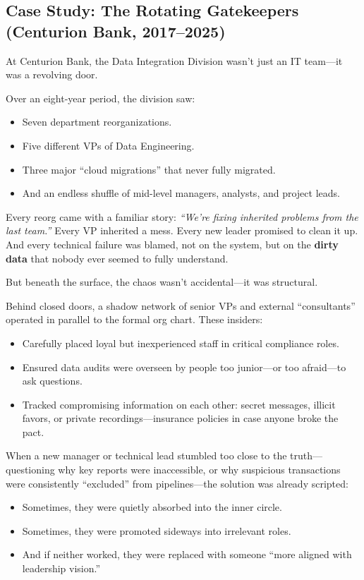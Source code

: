 \subsection{Case Study: The Rotating Gatekeepers (Centurion Bank, 2017–2025)}

At Centurion Bank, the Data Integration Division wasn’t just an IT team—it was a revolving door.

Over an eight-year period, the division saw:
\begin{itemize}
  \item Seven department reorganizations.
  \item Five different VPs of Data Engineering.
  \item Three major “cloud migrations” that never fully migrated.
  \item And an endless shuffle of mid-level managers, analysts, and project leads.
\end{itemize}

Every reorg came with a familiar story:  
\textit{“We’re fixing inherited problems from the last team.”}  
Every VP inherited a mess. Every new leader promised to clean it up.  
And every technical failure was blamed, not on the system, but on the \textbf{dirty data} that nobody ever seemed to fully understand.

\medskip

But beneath the surface, the chaos wasn’t accidental—it was structural.

Behind closed doors, a shadow network of senior VPs and external “consultants” operated in parallel to the formal org chart. These insiders:
\begin{itemize}
  \item Carefully placed loyal but inexperienced staff in critical compliance roles.
  \item Ensured data audits were overseen by people too junior—or too afraid—to ask questions.
  \item Tracked compromising information on each other: secret messages, illicit favors, or private recordings—insurance policies in case anyone broke the pact.
\end{itemize}

When a new manager or technical lead stumbled too close to the truth—questioning why key reports were inaccessible, or why suspicious transactions were consistently “excluded” from pipelines—the solution was already scripted:
\begin{itemize}
  \item Sometimes, they were quietly absorbed into the inner circle.
  \item Sometimes, they were promoted sideways into irrelevant roles.
  \item And if neither worked, they were replaced with someone “more aligned with leadership vision.”
\end{itemize}

